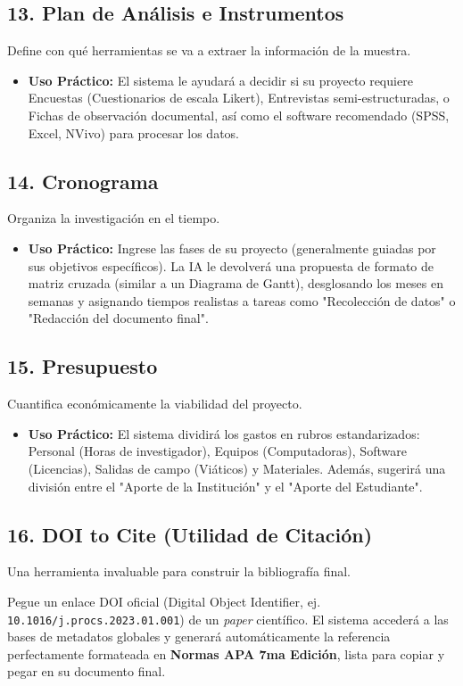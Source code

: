 \documentclass[12pt,a4paper]{article}
\begin{document}
\subsection{13. Plan de Análisis e Instrumentos}
Define con qué herramientas se va a extraer la información de la muestra.
\begin{itemize}
    \item \textbf{Uso Práctico:} El sistema le ayudará a decidir si su proyecto requiere Encuestas (Cuestionarios de escala Likert), Entrevistas semi-estructuradas, o Fichas de observación documental, así como el software recomendado (SPSS, Excel, NVivo) para procesar los datos.
\end{itemize}

\subsection{14. Cronograma}
Organiza la investigación en el tiempo.
\begin{itemize}
    \item \textbf{Uso Práctico:} Ingrese las fases de su proyecto (generalmente guiadas por sus objetivos específicos). La IA le devolverá una propuesta de formato de matriz cruzada (similar a un Diagrama de Gantt), desglosando los meses en semanas y asignando tiempos realistas a tareas como "Recolección de datos" o "Redacción del documento final".
\end{itemize}

\subsection{15. Presupuesto}
Cuantifica económicamente la viabilidad del proyecto.
\begin{itemize}
    \item \textbf{Uso Práctico:} El sistema dividirá los gastos en rubros estandarizados: Personal (Horas de investigador), Equipos (Computadoras), Software (Licencias), Salidas de campo (Viáticos) y Materiales. Además, sugerirá una división entre el "Aporte de la Institución" y el "Aporte del Estudiante".
\end{itemize}

\subsection{16. DOI to Cite (Utilidad de Citación)}
Una herramienta invaluable para construir la bibliografía final.
\begin{tcolorbox}[colback=lightgray, colframe=primary, title=Uso Rápido]
Pegue un enlace DOI oficial (Digital Object Identifier, ej. \texttt{10.1016/j.procs.2023.01.001}) de un \textit{paper} científico. El sistema accederá a las bases de metadatos globales y generará automáticamente la referencia perfectamente formateada en \textbf{Normas APA 7ma Edición}, lista para copiar y pegar en su documento final.
\end{tcolorbox}
\end{document}
